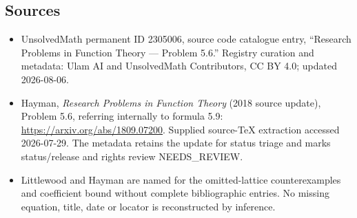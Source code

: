 \documentclass[11pt]{article}
\begin{document}
\subsection{Sources}
\begin{itemize}
\item UnsolvedMath permanent ID 2305006, source code catalogue entry, ``Research Problems in Function Theory --- Problem 5.6.'' Registry curation and metadata: Ulam AI and UnsolvedMath Contributors, CC BY 4.0; updated 2026-08-06.
\item Hayman, \emph{Research Problems in Function Theory} (2018 source update), Problem 5.6, referring internally to formula 5.9: \url{https://arxiv.org/abs/1809.07200}. Supplied source-TeX extraction accessed 2026-07-29. The metadata retains the update for status triage and marks status/release and rights review NEEDS\_REVIEW.
\item Littlewood and Hayman are named for the omitted-lattice counterexamples and coefficient bound without complete bibliographic entries. No missing equation, title, date or locator is reconstructed by inference.
\end{itemize}
\end{document}

